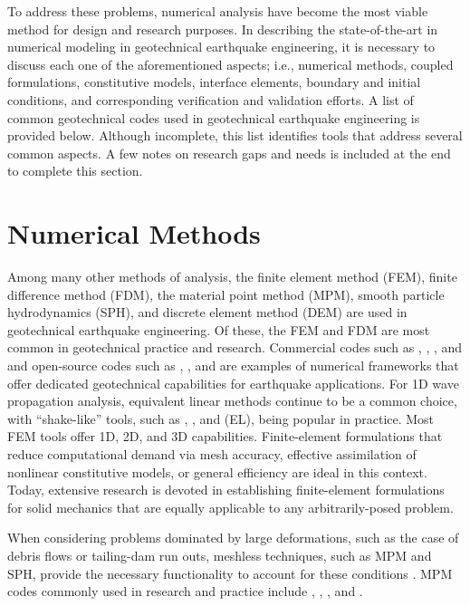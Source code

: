 To address these problems, numerical analysis have become the most viable method for design and research purposes. In describing the state-of-the-art in numerical modeling in geotechnical earthquake engineering, it is necessary to discuss each one of the aforementioned aspects; i.e., numerical methods, coupled formulations, constitutive models, interface elements, boundary and initial conditions, and corresponding verification and validation efforts. A list of common geotechnical codes used in geotechnical earthquake engineering is provided below. Although incomplete, this list identifies tools that address several common aspects. A few notes on research gaps and needs is included at the end to complete this section. 

\section{Numerical Methods}
\label{sec:resp_geotech_1}

Among many other methods of analysis, the finite element method (FEM), finite difference method (FDM), the material point method (MPM), smooth particle hydrodynamics (SPH), and discrete element method (DEM) are used in geotechnical earthquake engineering. Of these, the FEM and FDM are most common in geotechnical practice and research. Commercial codes such as \citealt{PLAXIS}, \citealt{FLAC}, \citealt{LS-DYNA}, and \citealt{ABAQUS} and open-source codes such as \citealt{OpenSees}, \citealt{FEAP}, and \citealt{ESSI} are examples of numerical frameworks that offer dedicated geotechnical capabilities for earthquake applications. For 1D wave propagation analysis, equivalent linear methods continue to be a common choice, with “shake-like” tools, such as \citealt{ProShake}, \citealt{Strata}, and \citealt{DeepSoil} (EL), being popular in practice. Most FEM tools offer 1D, 2D, and 3D capabilities. Finite-element formulations that reduce computational demand via mesh accuracy, eﬀective assimilation of nonlinear constitutive models, or general eﬃciency \citep{McGann12, McGann15} are ideal in this context. Today, extensive research is devoted in establishing ﬁnite-element formulations for solid mechanics that are equally applicable to any arbitrarily-posed problem.

When considering problems dominated by large deformations, such as the case of debris flows or tailing-dam run outs, meshless techniques, such as MPM and SPH, provide the necessary functionality to account for these conditions \citep{Mast15}. MPM codes commonly used in research and practice include \citealt{CB-Geo-MPM}, \citealt{Claymore}, \citealt{Uintah}, and \citealt{Anura3D}.

